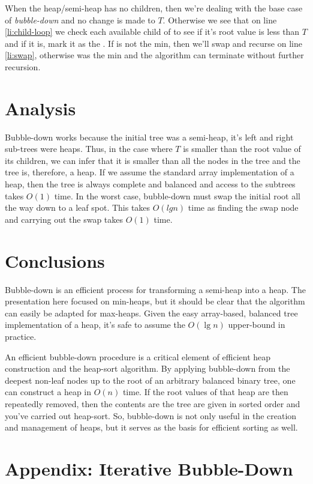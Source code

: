 \documentclass[]{article}
\begin{document}
When the heap/semi-heap  has no children,  then we're dealing with the base case of \textit{bubble-down} and no change is made to $T$. Otherwise we see that on line \ref{li:child-loop} we check each available child of  to see if it's root value is less than $T$ and if it is, mark it as the . If  is not the min, then we'll swap and recurse on line \ref{li:swap}, otherwise  was the min and the algorithm can terminate without further recursion.  

\section{Analysis}

Bubble-down works because the initial tree was a semi-heap, it's left and right sub-trees were heaps.  Thus, in the case where $T$ is smaller than the root value of its children, we can infer that it is smaller than all the nodes in the tree and the tree is, therefore, a heap.  If we assume the standard array implementation of a heap, then the tree is always complete and balanced and access to the subtrees takes $O(1)$ time.  In the worst case, bubble-down must swap the initial root all the way down to a leaf spot.  This takes $O(lg n)$ time as finding the swap node and carrying out the swap takes $O(1)$ time.

\section{Conclusions}

Bubble-down is an efficient process for transforming a semi-heap into a heap. The presentation here focused on min-heaps,  but it should be clear that the algorithm can easily be adapted for max-heaps. Given the easy array-based, balanced tree implementation of a heap, it's safe to assume the $O(\lg n)$ upper-bound in practice. 

An efficient bubble-down procedure is a critical element of efficient heap construction and the heap-sort algorithm. By applying bubble-down from the deepest non-leaf nodes up to the root of an arbitrary balanced binary tree, one can construct a heap in $O(n)$ time.  If the root values of that heap are then repeatedly removed, then the contents are the tree are given in sorted order and you've carried out heap-sort. So, bubble-down is not only useful in the creation and management of heaps, but it serves as the basis for efficient sorting as well.

\newpage
\section{Appendix: Iterative Bubble-Down}
\end{document}
